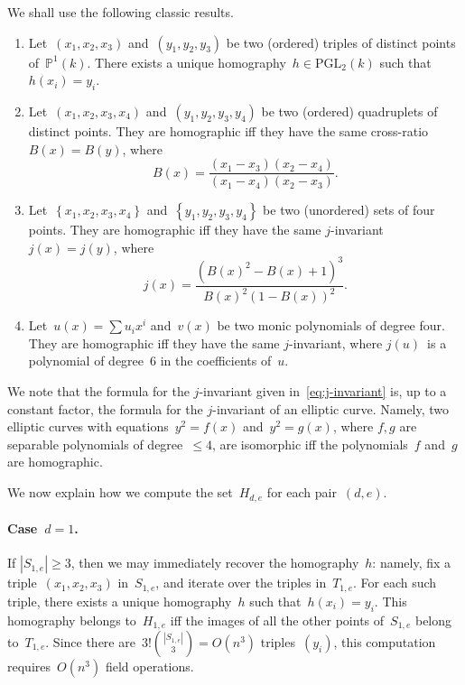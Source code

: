 \documentclass{lms}%
\def\acco#1{\left\{#1\right\}}
\def\abs#1{\left|#1\right|}
\def\card#1{\abs{#1}}
\begin{document}
We shall use the following classic results.
\begin{prop}\label{prop:homography}
\begin{enumerate}
\item Let~$(x_1, x_2, x_3)$ and~$(y_1, y_2, y_3)$ be two (ordered)
triples of distinct points of~$ℙ^1(k)$. There exists a unique
homography~$h ∈ \mathrm{PGL}_2(k)$ such that~$h(x_i) = y_i$.
\item Let~$(x_1, x_2, x_3, x_4)$ and~$(y_1, y_2, y_3, y_4)$ be two
(ordered) quadruplets of distinct points. They are homographic iff they
have the same cross-ratio~$B(x) = B(y)$, where
\begin{equation}
B(x) = \frac{(x_1-x_3)(x_2-x_4)}{(x_1-x_4)(x_2-x_3)}.
\end{equation}
\item Let~$\acco{x_1, x_2, x_3, x_4}$ and~$\acco{y_1, y_2, y_3, y_4}$ be
two (unordered) sets of four points. They are homographic iff they have
the same $j$-invariant~$j(x) = j(y)$, where
\begin{equation}\label{eq:j-invariant}
j(x) = \frac{(B(x)^2-B(x)+1)^3}{B(x)^2(1-B(x))^2}.
\end{equation}
\item Let~$u(x) = ∑ u_i x^i$ and~$v(x)$ be two monic polynomials
of degree four. They are homographic iff they have the same $j$-invariant,
where $j(u)$~is a polynomial of degree~$6$ in the coefficients of~$u$.
\end{enumerate}
\end{prop}

We note that the formula for the $j$-invariant given
in~\eqref{eq:j-invariant} is, up to a constant factor, the formula for
the $j$-invariant of an elliptic curve. Namely, two elliptic curves with
equations~$y^2 = f(x)$ and~$y^2 = g(x)$, where $f, g$ are separable
polynomials of degree~$≤ 4$, are isomorphic iff the polynomials~$f$
and~$g$ are homographic.

\bigbreak
We now explain how we compute the set~$H_{d,e}$ for each pair~$(d,e)$.

\paragraph{Case~$d = 1$.}
If $\card{S_{1,e}} ≥ 3$, then we may immediately recover the
homography~$h$: namely, fix a triple~$(x_1,x_2,x_3)$ in~$S_{1,e}$, and
iterate over the triples in~$T_{1,e}$. For each such triple, there exists
a unique homography~$h$ such that~$h(x_i) = y_i$. This homography belongs
to~$H_{1,e}$ iff the images of all the other points of~$S_{1,e}$ belong
to~$T_{1,e}$. Since there are~$3!\binom{\card{S_{1,e}}}{3} = O(n^3)$
triples~$(y_i)$, this computation requires~$O(n^3)$ field operations.
\end{document}

